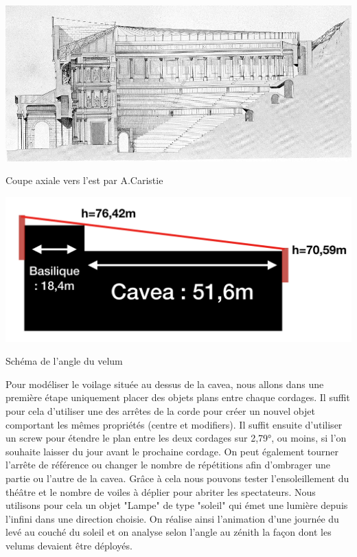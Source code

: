  \begin{figureth}
	\begin{subfigureth}{0.49\textwidth}
		\includegraphics[width=\linewidth]{images/velum2}
	\caption[Coupe axiale vers l'est par A.Caristie]{Coupe axiale vers l'est par A.Caristie \footnotemark} 
	\label{velum2} 
	\end{subfigureth}	
	\begin{subfigureth}{0.49\textwidth}
		\includegraphics[width=\linewidth]{images/dessinvelum}
		\caption{Schéma de l'angle du velum}
		\label{dessinvelum} 		
	\end{subfigureth}	
\end{figureth}

Pour modéliser le voilage située au dessus de la \gls{cavea}, nous allons dans une première étape uniquement placer des objets plans entre chaque cordages. Il suffit pour cela d'utiliser une des arrêtes de la corde pour créer un nouvel objet comportant les mêmes propriétés (centre et \glspl{modifier}). Il suffit ensuite d'utiliser un \gls{screw} pour étendre le plan entre les deux cordages sur 2,79°, ou moins, si l'on souhaite laisser du jour avant le prochaine cordage. On peut également tourner l'arrête de référence ou changer le nombre de répétitions afin d'ombrager une partie ou l'autre de la \gls{cavea}. Grâce à cela nous pouvons tester l'ensoleillement du théâtre et le nombre de voiles à déplier pour abriter les spectateurs. Nous utilisons pour cela un objet "Lampe" de type "soleil" qui émet une lumière depuis l'infini dans une direction choisie. On réalise ainsi l'animation d'une journée du levé au couché du soleil et on analyse selon l'angle au zénith la façon dont les \glspl{velum} devaient être déployés.


